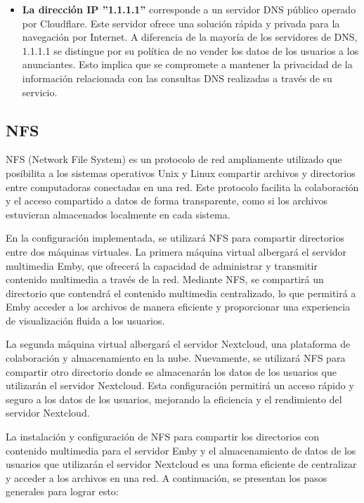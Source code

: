		
		\begin{itemize}
			
			\item \textbf{La dirección IP ''1.1.1.1''} corresponde a un servidor DNS público operado por Cloudflare. Este servidor ofrece una solución rápida y privada para la navegación por Internet. A diferencia de la mayoría de los servidores de DNS, 1.1.1.1 se distingue por su política de no vender los datos de los usuarios a los anunciantes. Esto implica que se compromete a mantener la privacidad de la información relacionada con las consultas DNS realizadas a través de su servicio.
		\end{itemize}
	
		\subsection{NFS}
		
		NFS (Network File System) es un protocolo de red ampliamente utilizado que posibilita a los sistemas operativos Unix y Linux compartir archivos y directorios entre computadoras conectadas en una red. Este protocolo facilita la colaboración y el acceso compartido a datos de forma transparente, como si los archivos estuvieran almacenados localmente en cada sistema.
		
		En la configuración implementada, se utilizará NFS para compartir directorios entre dos máquinas virtuales. La primera máquina virtual albergará el servidor multimedia Emby, que ofrecerá la capacidad de administrar y transmitir contenido multimedia a través de la red. Mediante NFS, se compartirá un directorio que contendrá el contenido multimedia centralizado, lo que permitirá a Emby acceder a los archivos de manera eficiente y proporcionar una experiencia de visualización fluida a los usuarios.
		
		La segunda máquina virtual albergará el servidor Nextcloud, una plataforma de colaboración y almacenamiento en la nube. Nuevamente, se utilizará NFS para compartir otro directorio donde se almacenarán los datos de los usuarios que utilizarán el servidor Nextcloud. Esta configuración permitirá un acceso rápido y seguro a los datos de los usuarios, mejorando la eficiencia y el rendimiento del servidor Nextcloud.
				
		La instalación y configuración de NFS para compartir los directorios con contenido multimedia para el servidor Emby y el almacenamiento de datos de los usuarios que utilizarán el servidor Nextcloud es una forma eficiente de centralizar y acceder a los archivos en una red. A continuación, se presentan los pasos generales para lograr esto:
		
